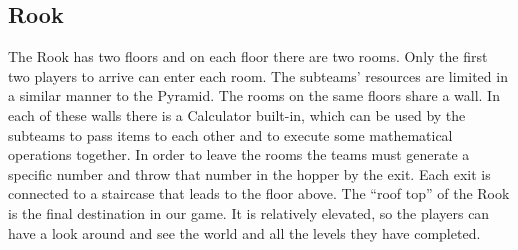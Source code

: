 \subsection{Rook}
The Rook has two floors and on each floor there are two rooms. Only the first two players to arrive can enter each room. The subteams’ resources are limited in a similar manner to the Pyramid. The rooms on the same floors share a wall. In each of these walls there is a Calculator built-in, which can be used by the subteams to pass items to each other and to execute some mathematical operations together.\newline\newline
In order to leave the rooms the teams must generate a specific number and throw that number in the hopper by the exit. Each exit is connected to a staircase that leads to the floor above. The “roof top” of the Rook is the final destination in our game. It is relatively elevated, so the players can have a look around and see the world and all the levels they have completed.



